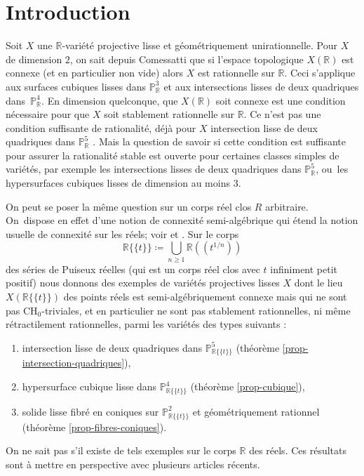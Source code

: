 \documentclass[11pt]{article}
\newenvironment{enumeratei}
{\bgroup\def\theenumi{\roman{enumi}}\def\theenumii{\arabic{enumii}}\begin{enumerate}}
{\end{enumerate}\egroup}
\newcommand{\CH}{\mathrm{CH}}
\theoremstyle{definition}
\newcommand{\R}{\mathbb R}
\renewcommand{\P}{\mathbb P}
\newcommand{\puiseux}{\mathbb{R}\{\!\{t\}\!\}}
\begin{document}
\section*{Introduction}

Soit $X$ une $\R$-variété projective lisse et géométriquement unirationnelle.
Pour $X$ de dimension $2$, on sait depuis Comessatti \cite{comessatti1912fondamenti} que si l'espace topologique $X(\R)$ est connexe (et en particulier non vide) alors $X$ est rationnelle sur $\R$. Ceci s'applique aux surfaces cubiques lisses dans $\P^3_{\R} $ et aux intersections lisses
de deux quadriques dans~$\P^4_{\R}$.
En dimension quelconque, que $X(\R)$ soit connexe
est une condition nécessaire pour que $X$ soit stablement rationnelle sur $\R$.
Ce n'est pas une condition suffisante de rationalité, déjà pour $X$
intersection lisse de deux quadriques dans $\P^5_\R$
\cite{hassett2021rationality}.
Mais la question de savoir si cette condition est suffisante pour assurer la rationalité stable est ouverte pour
certaines classes simples de variétés, par exemple les intersections lisses de deux quadriques dans $\P^5_\R$, ou~les hypersurfaces cubiques lisses de dimension au moins $3$.

On peut se poser la même question sur un corps réel clos $R$ arbitraire. On~dispose en effet d'une notion de connexité semi-algébrique qui étend la notion usuelle de connexité sur les réels; voir \cite{delfs1981semialgebraicI} et \cite[Def.\,2.4.2]{bochnak1998real}. Sur le corps \[\puiseux\coloneqq \bigcup_{n\geq1} \R(\!(t^{1/n})\!)\]
des séries de Puiseux réelles (qui est un corps réel clos avec $t$ infiniment petit positif) nous donnons des exemples
de variétés projectives lisses $X$ dont le lieu $X(\puiseux)$ des points réels est
semi-algébriquement connexe mais qui ne sont pas
$\CH_{0}$-triviales, et en particulier ne sont pas stablement rationnelles,
ni même rétractilement rationnelles, parmi les variétés des types suivants :

\begin{enumeratei}
\item\label{enum:i}
intersection lisse de deux quadriques dans $\P^5_{\puiseux}$ (théorème \ref{prop-intersection-quadriques}),
\item\label{enum:ii}
hypersurface cubique lisse dans $\P^4_{\puiseux}$ (théorème \ref{prop-cubique}),
\item\label{enum:iii}
solide lisse fibré en coniques sur $ \P^2_{\puiseux}$ et géométriquement rationnel (théorème \ref{prop-fibres-coniques}).
\end{enumeratei}
On ne sait pas s'il existe de tels exemples sur le corps $\R$ des réels.
Ces résultats sont à mettre en perspective avec plusieurs articles récents.
\end{document}
